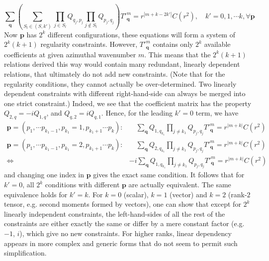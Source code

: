 \documentclass[a4paper, 11pt]{article}
\begin{document}
\begin{equation}\label{eqn:cond-suff}
    \sum_{\mathbf{q}} \left(\sum_{S_l \in (S, k')} \prod_{j\in S_l} Q_{q_j,p_j} \prod_{j\notin S_l} Q_{p_{j},q_{j}}\right) T'^m_\mathbf{q} = r^{|m + k - 2k'|} C(r^2),\quad k' = 0, 1, \cdots k, \forall \mathbf{p}
\end{equation}
Now $\mathbf{p}$ has $2^k$ different configurations, these equations will form a system of $2^k(k+1)$ regularity constraints. However, $T'^m_\mathbf{q}$ contains only $2^k$ available coefficients at given azimuthal wavenumber $m$. This means that the $2^k(k+1)$ relations derived this way would contain many redundant, linearly dependent relations, that ultimately do not add new constraints. (Note that for the regularity conditions, they cannot actually be over-determined. Two linearly dependent constraints with different right-hand-side can always be merged into one strict constraint.) Indeed, we see that the coefficient matrix has the property $Q_{2,q} = -i Q_{1,q}$, and $Q_{q,2} = iQ_{q,1}$. Hence, for the leading $k'=0$ term, we have
\[\begin{aligned}
    \mathbf{p} = \left(p_1, \cdots p_{k_1-1}, p_{k_1}=1, p_{k_1+1}\cdots p_k\right):& \quad \sum_{\mathbf{q}} Q_{1,q_{k_1}} \prod_{j\neq k_1} Q_{p_j,q_j} T'^m_\mathbf{q} = r^{|m+k|} C(r^2) \\ 
    \mathbf{p} = \left(p_1, \cdots p_{k_1-1}, p_{k_1}=2, p_{k_1+1}\cdots p_k\right):& \quad \sum_{\mathbf{q}} Q_{2,q_{k_1}} \prod_{j\neq k_1} Q_{p_j,q_j} T'^m_\mathbf{q} = r^{|m+k|} C(r^2) \\ 
    \Longleftrightarrow \quad & -i \sum_{\mathbf{q}} Q_{1,q_{k_1}} \prod_{j\neq k_1} Q_{p_j,q_j} T'^m_\mathbf{q} = r^{|m+k|} C(r^2)
\end{aligned}\]
and changing one index in $\mathbf{p}$ gives the exact same condition. It follows that for $k'=0$, all $2^k$ conditions with different $\mathbf{p}$ are actually equivalent. The same equivalence holds for $k'=k$.
For $k=0$ (scalar), $k=1$ (vector) and $k=2$ (rank-$2$ tensor, e.g. second moments formed by vectors), one can show that except for $2^k$ linearly independent constraints, the left-hand-sides of all the rest of the constraints are either exactly the same or differ by a mere constant factor (e.g. $-1$, $i$), which give no new constraints. For higher ranks, linear dependency appears in more complex and generic forms that do not seem to permit such simplification.
\end{document}
